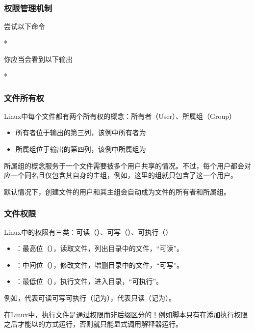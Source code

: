 \begin{frame}
    \frametitle{权限管理机制}
    尝试以下命令
    \begin{Code}*
        
    \end{Code}
    你应当会看到以下输出
    \begin{Code}*
        
    \end{Code}
\end{frame}

\begin{frame}
    \frametitle{文件所有权}
    Linux中每个文件都有两个所有权的概念：\alert{所有者}（User）、\alert{所属组}（Group）
    \begin{itemize}
        \item 所有者位于输出的第三列，该例中所有者为
        \item 所属组位于输出的第四列，该例中所属组为
    \end{itemize}
    所属组的概念服务于一个文件需要被多个用户共享的情况。不过，每个用户都会对应一个同名且仅包含其自身的主组，例如，这里的组就只包含了这一个用户。
    
    默认情况下，创建文件的用户和其主组会自动成为文件的所有者和所属组。
\end{frame}

\begin{frame}
    \frametitle{文件权限}
    Linux中的权限有三类：\alert{可读}（）、\alert{可写}（）、\alert{可执行}（）
    \begin{itemize}
        \item {}：最高位（），读取文件，列出目录中的文件，“可读”。
        \item {}：中间位（），修改文件，增删目录中的文件，“可写”。
        \item {}：最低位（），执行文件，进入目录，“可执行”。
    \end{itemize}
    例如，代表可读可写可执行（记为），代表只读（记为）。

    在Linux中，执行文件是通过权限而非后缀区分的！例如脚本只有在添加执行权限之后才能以的方式运行，否则就只能显式调用解释器运行。
\end{frame}

